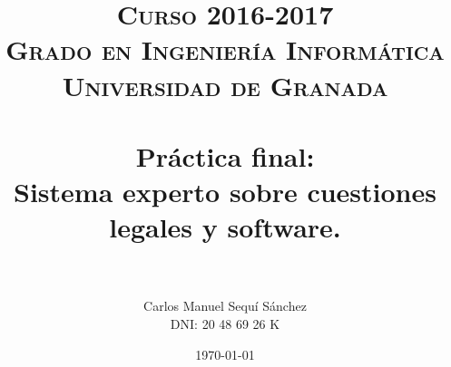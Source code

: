 


\title{	
\normalfont \normalsize 
\textsc{\textbf{Curso 2016-2017} \\ Grado en Ingeniería Informática \\ Universidad de Granada} \\ [25pt] %
\horrule{0.5pt} \\[0.4cm] %
\huge Práctica final: \\ Sistema experto sobre cuestiones legales y software. \\ %
\horrule{2pt} \\[0.5cm] %
}

\author{Carlos Manuel Sequí Sánchez \\ DNI: 20 48 69 26 K} %

\date{\normalsize\today} %




\maketitle %

\newpage %

\tableofcontents %



\newpage

